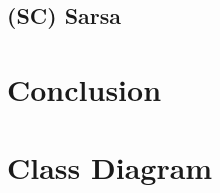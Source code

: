 \documentclass{article}
\begin{document}
\subsection{(SC) Sarsa}

\section{Conclusion}

\newpage
\nocite{*}



\newpage
\appendix
\appendixpage
\section{Class Diagram} \label{app:classDiagram}
\end{document}
